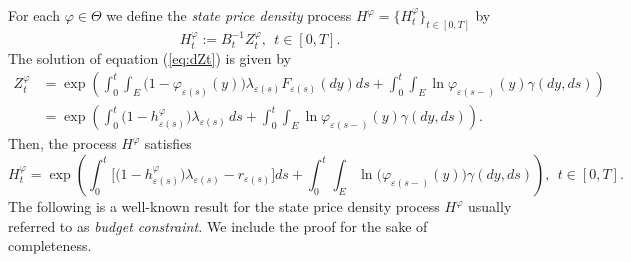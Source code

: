 \documentclass[11pt]{article}
\theoremstyle{plain}
\theoremstyle{definition}
\numberwithin{equation}{section}
\newcommand{\eps}{\varepsilon}
\begin{document}
For each $\varphi\in\Theta$ we define the \emph{state price density} process $H^\varphi=\{H_t^{\varphi}\}_{t\in[0,T]}$ by
\[
H_t^{\varphi}:=B_{t}^{-1}Z_t^\varphi, \ \ t\in [0,T].
\]
The solution of equation (\ref{eq:dZt}) is given by
\begin{align*}
Z_t^\varphi&=\exp\left(\int_0^t\int_{E}\bigl(1-\varphi_{\eps(s)}(y)\bigr)\lambda_{\eps(s)}F_{\eps(s)}(dy)ds+\int_0^t\int_{E}\ln \varphi_{\eps(s-)}(y)\gamma(dy,ds)\right)\\
&=\exp\left(\int_0^t\bigl(1-h_{\eps(s)}^{\varphi}\bigr)\lambda_{\eps(s)}\,ds+\int_0^t\int_{E}\ln \varphi_{\eps(s-)}(y)\gamma(dy,ds)\right).
\end{align*}
Then, the process $H^{\varphi}$ satisfies
\begin{equation*}
H_t^{\varphi}
=\exp\left(\int_0^t\bigl[\bigl(1-h_{\eps(s)}^{\varphi}\bigr)\lambda_{\eps(s)}-r_{\eps(s)}\bigr]ds+\int_0^t\int_{E}\ln\bigl(\varphi_{\eps(s-)}(y)\bigr)\gamma(dy,ds)\right), \ \ t\in [0,T].
\end{equation*}
The following is a well-known result for the state price density process $H^\varphi$ usually referred to as \emph{budget constraint.} We include the proof for the sake of completeness.
\end{document}
